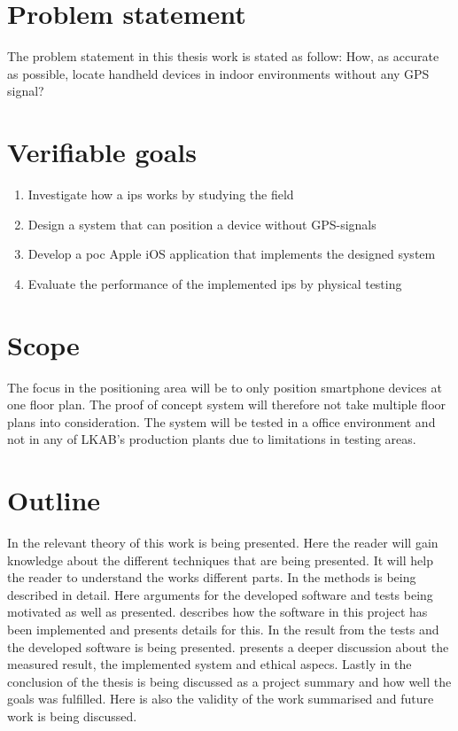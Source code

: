 \section{Problem statement}\label{sec:introProblemStatement}
The problem statement in this thesis work is stated as follow: How, as accurate as possible, locate handheld devices in indoor environments without any GPS signal?


\section{Verifiable goals}\label{sec:introGoals}
\begin{enumerate}
	\item \label{goal:fieldInvestigation}
	Investigate how a \acrfull{ips} works by studying the field

	\item \label{goal:systemDesign}
	Design a system that can position a device without GPS-signals

	\item \label{goal:poc}
	Develop a \acrlong{poc} Apple iOS application that implements the designed system

	\item \label{goal:systemEvaluation}
	Evaluate the performance of the implemented \acrlong{ips} by physical testing
\end{enumerate}


\section{Scope}
The focus in the positioning area will be to only position smartphone devices at one floor plan.
The proof of concept system will therefore not take multiple floor plans into consideration.
The system will be tested in a office environment and not in any of LKAB's production plants due to
limitations in testing areas.


\section{Outline}
In  the relevant theory of this work is being presented.
Here the reader will gain knowledge about the different techniques that are being presented.
It will help the reader to understand the works different parts.
In  the methods is being described in detail.
Here arguments for the developed software and tests being motivated as well as presented.
 describes how the software in this project has been implemented and presents details for this.
In  the result from the tests and the developed software is being presented.
 presents a deeper discussion about the measured result, the implemented system and ethical aspecs.
Lastly in  the conclusion of the thesis is being discussed as a project summary and how well the goals was fulfilled.
Here is also the validity of the work summarised and future work is being discussed.

